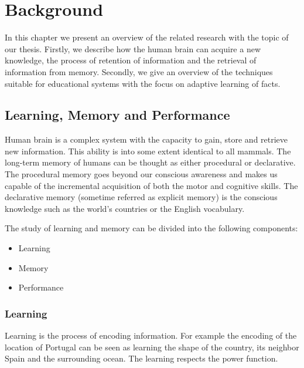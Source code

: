 \chapter{Background}

In this chapter we present an overview of the related research with the topic of our thesis. Firstly, we describe how the human brain can acquire a new knowledge, the process of retention of information and the retrieval of information from memory. Secondly, we give an overview of the techniques suitable for educational systems with the focus on adaptive learning of facts.

\section{Learning, Memory and Performance}


Human brain is a complex system with the capacity to gain, store and retrieve new information. This ability is into some extent identical to all mammals. The long-term memory of humans can be thought as either procedural or declarative. The procedural memory goes beyond our conscious awareness and makes us capable of the incremental acquisition of both the motor and cognitive skills. The declarative memory (sometime referred as explicit memory) is the conscious knowledge such as the world's countries or the English vocabulary.

The study of learning and memory can be divided into the following components:

\begin{itemize}
  \item Learning
  \item Memory
  \item Performance
\end{itemize}

\subsection{Learning}


Learning is the process of encoding information. For example the encoding of the location of Portugal can be seen as learning the shape of the country,  its neighbor Spain and the surrounding ocean. The learning respects the power function.

